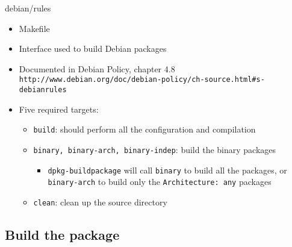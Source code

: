 \documentclass[red,10pt,a4paper]{beamer}
\begin{document}
\begin{frame}[fragile]{debian/rules}
  \hbr
  \begin{itemize}
  \item Makefile
    \br
  \item Interface used to build Debian packages
    \br
  \item Documented in Debian Policy, chapter 4.8\\
    {\small \texttt{http://www.debian.org/doc/debian-policy/ch-source.html\#s-debianrules}}
    \br
  \item Five required targets:
    \begin{itemize}
    \item \texttt{build}: should perform all the configuration and compilation
      \hbr
    \item \texttt{binary, binary-arch, binary-indep}: build the binary packages
      \begin{itemize}
      \item \texttt{dpkg-buildpackage} will call \texttt{binary} to build all
        the packages, or \texttt{binary-arch} to build only the
        \texttt{Architecture:~any} packages
      \end{itemize}
      \hbr
    \item \texttt{clean}: clean up the source directory
    \end{itemize}
  \end{itemize}
\end{frame}

\subsection{Build the package}
\end{document}
